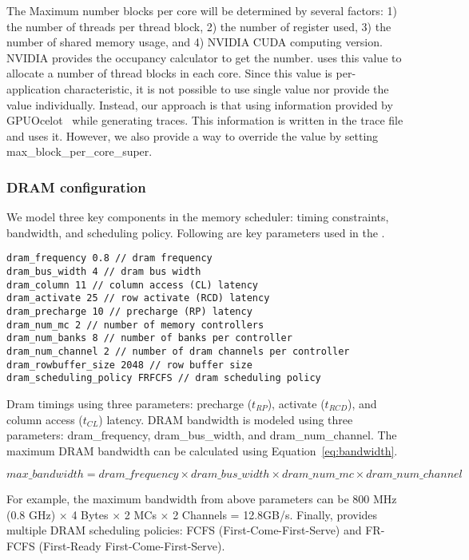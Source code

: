 The Maximum number blocks per core will be determined by several
factors: 1) the number of threads per thread block, 2) the number of
register used, 3) the number of shared memory usage, and 4) NVIDIA
CUDA computing version. NVIDIA provides the occupancy calculator to
get the number. \SIM uses this value to allocate a number of thread
blocks in each core. Since this value is per-application
characteristic, it is not possible to use single value nor provide the
value individually. Instead, our approach is that using information
provided by GPUOcelot~\cite{ocelot} while generating traces. This
information is written in the trace file and \SIM uses it. However, we
also provide a way to override the value by
setting \textsf{max\_block\_per\_core\_super}.



\subsubsection{DRAM configuration}

We model three key components in the memory scheduler: timing
constraints, bandwidth, and scheduling policy. Following are key
parameters used in the \SIM.


\smallskip
\begin{lstlisting}
dram_frequency 0.8 // dram frequency
dram_bus_width 4 // dram bus width
dram_column 11 // column access (CL) latency
dram_activate 25 // row activate (RCD) latency
dram_precharge 10 // precharge (RP) latency
dram_num_mc 2 // number of memory controllers
dram_num_banks 8 // number of banks per controller
dram_num_channel 2 // number of dram channels per controller
dram_rowbuffer_size 2048 // row buffer size
dram_scheduling_policy FRFCFS // dram scheduling policy
\end{lstlisting}
\smallskip

Dram timings using three parameters: precharge ($t_{RP}$), activate
($t_{RCD}$), and column access ($t_{CL}$) latency. DRAM bandwidth is
modeled using three
parameters: \textsf{dram\_frequency}, \textsf{dram\_bus\_width},
and \textsf{dram\_num\_channel}. The maximum DRAM bandwidth can be
calculated using Equation~\ref{eq:bandwidth}.

\begin{equation}
\label{eq:bandwidth}
max\_bandwidth = dram\_frequency \times dram\_bus\_width \times dram\_num\_mc \times dram\_num\_channel 
\end{equation}

For example, the maximum bandwidth from above parameters can
be \textsf{800 MHz (0.8 GHz)} $\times$ \textsf{4 Bytes}
$\times$ \textsf{2 MCs} $\times$ \textsf{2 Channels}
= \textsf{12.8GB/s}. Finally, \SIM provides multiple DRAM scheduling
policies: FCFS (First-Come-First-Serve) and FR-FCFS (First-Ready
First-Come-First-Serve).


